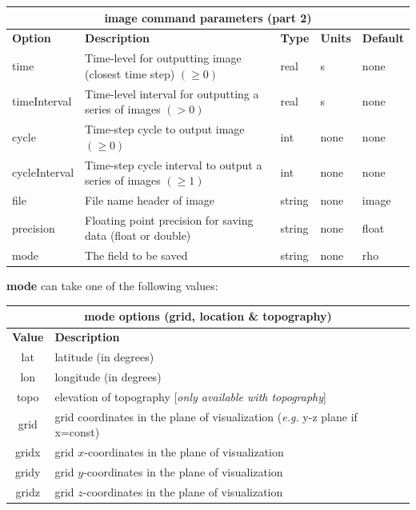 \documentclass[11pt]{report}
\begin{document}
\begin{center}
\begin{tabular}{|l|p{8cm}|l|l|l|} \hline
\multicolumn{5}{|c|}{\bf image command parameters (part 2)}\\ \hline
\bf{Option} & \bf{Description}                             & \bf{Type} & \bf{Units} & \bf{Default} \\ 
\hline \hline
time          & Time-level for outputting image (closest time step) $(\geq 0)$ & real  & s    & none \\ \hline
timeInterval  & Time-level interval for outputting a series of images $(> 0)$  & real  & s    & none \\ \hline
cycle         & Time-step cycle to output image $(\geq 0)$                     & int    & none & none \\ \hline
cycleInterval & Time-step cycle interval to output a series of images $(\geq 1)$ & int    & none & none \\ \hline\hline
file          & File name header of image                                   & string & none & image \\ \hline
precision     & Floating point precision for saving data (float or double)  & string & none & float \\ \hline
mode          & The field to be saved                                       & string & none & rho \\ \hline
\end{tabular}
\end{center}
%
{\bf mode} can take one of the following values:
%
\begin{center}
\begin{tabular}{|c|l|} \hline
\multicolumn{2}{|c|}{\bf mode options (grid, location \& topography)}\\ \hline
\bf{Value} & \bf{Description} \\ 
\hline  \hline
lat     & latitude (in degrees)  \\ \hline
lon     & longitude (in degrees) \\ \hline
topo    & elevation of topography [\emph{only available with topography}]\\ \hline
grid    & grid coordinates in the plane of visualization (\emph{e.g.} y-z plane if x=const) \\ \hline
gridx   & grid $x$-coordinates in the plane of visualization \\ \hline
gridy   & grid $y$-coordinates in the plane of visualization \\ \hline
gridz   & grid $z$-coordinates in the plane of visualization \\ \hline
\end{tabular}
\end{center}
\end{document}
